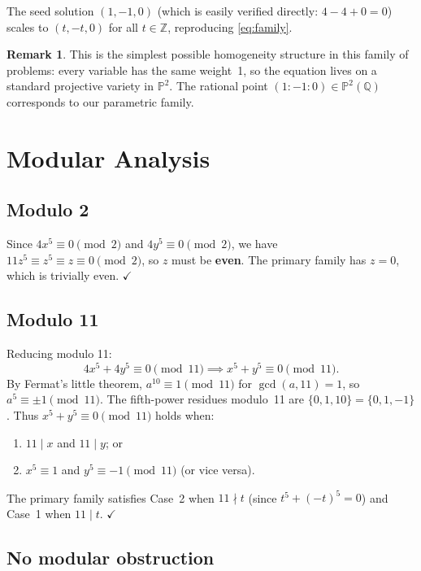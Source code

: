 \documentclass[12pt,a4paper]{article}
\theoremstyle{definition}
\newtheorem{remark}[theorem]{Remark}
\newcommand{\Z}{\mathbb{Z}}
\newcommand{\Q}{\mathbb{Q}}
\begin{document}
The seed solution $(1, -1, 0)$ (which is easily verified directly: $4 - 4 + 0 = 0$)
scales to $(t, -t, 0)$ for all $t \in \Z$, reproducing \eqref{eq:family}.

\begin{remark}
  This is the simplest possible homogeneity structure in this family of problems:
  every variable has the same weight~1, so the equation lives on a standard
  projective variety in $\mathbb{P}^2$.  The rational point
  $(1 : -1 : 0) \in \mathbb{P}^2(\Q)$ corresponds to our parametric family.
\end{remark}

\section{Modular Analysis}\label{sec:modular}

\subsection{Modulo 2}

Since $4x^5 \equiv 0 \pmod{2}$ and $4y^5 \equiv 0 \pmod{2}$, we have
$11z^5 \equiv z^5 \equiv z \equiv 0 \pmod{2}$, so $z$ must be \textbf{even}.  The
primary family has $z = 0$, which is trivially even. $\checkmark$

\subsection{Modulo 11}

Reducing modulo 11:
\[
  4x^5 + 4y^5 \equiv 0 \pmod{11} \implies x^5 + y^5 \equiv 0 \pmod{11}.
\]
By Fermat's little theorem, $a^{10} \equiv 1 \pmod{11}$ for $\gcd(a,11)=1$, so
$a^5 \equiv \pm 1 \pmod{11}$.  The fifth-power residues modulo~11 are
$\{0, 1, 10\} = \{0, 1, -1\}$.  Thus $x^5 + y^5 \equiv 0 \pmod{11}$ holds when:
\begin{enumerate}
  \item $11 \mid x$ and $11 \mid y$; or
  \item $x^5 \equiv 1$ and $y^5 \equiv -1 \pmod{11}$ (or vice versa).
\end{enumerate}
The primary family satisfies Case~2 when $11 \nmid t$ (since $t^5 + (-t)^5 = 0$) and
Case~1 when $11 \mid t$. $\checkmark$

\subsection{No modular obstruction}
\end{document}
